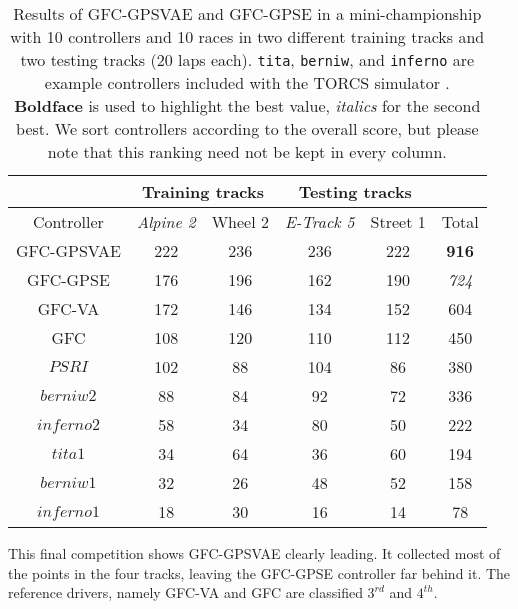 \documentclass[10pt,journal,compsoc]{IEEEtran}
\begin{document}
\begin{table}[ht]
  \centering
  {\scriptsize
    \caption{ Results of {\sf GFC-GPSVAE} and {\sf GFC-GPSE}
      in a mini-championship with 10 controllers
      and 10 races in two different training tracks and two testing tracks (20 laps each). {\tt tita}, {\tt berniw}, and {\tt inferno} are example controllers included with the TORCS
      simulator \cite{torcs4}.  {\bf Boldface} is used to highlight
      the best value, {\em italics} for the second
      best. We sort controllers according to the
        overall score, but please note that this ranking need not be
        kept in every column.}
    {
            \begin{tabular}{|c|c|c|c|c||c|}
	\hline
	& \multicolumn{2}{|c|}{Training tracks} &\multicolumn{2}{|c|}{Testing tracks}& \\
	\hline
	Controller&\textit{Alpine 2} &Wheel 2&\textit{E-Track 5}  &Street 1&Total\\
        \hline
        \hline



{\sf GFC-GPSVAE}	&222&236&236&222&	{\bf 916}\\
{\sf GFC-GPSE}	&176&196&162&190&{\em 724}\\

{\sf GFC-VA} \cite{DBLP:conf/cig/SalemMG19}&172&146&	134&152& 604\\
{\sf GFC}  \cite{salem_cig2018}	&108&	120&110&	112&	450\\
$PSRI$\cite{PerezEvolvingFuzzy09}&102&88 &104&86 &380\\
$berniw2$		&88	&84 &92 &72 &336\\
$inferno2$	&58	&34 &80 &50 &222\\
$tita1$		&34 &64 &36 &60 &194\\
$berniw1$		&32	&26 &48 &52 &158\\
$inferno1$	&18	&30 &16 &14 &78\\
\hline

\end{tabular}
}\label{tab:allsresults}
}
\end{table}




This final competition shows {\sf GFC-GPSVAE} clearly leading. It
collected most of the points in the four tracks, leaving the {\sf
  GFC-GPSE} controller far behind it. The reference drivers, namely
{\sf GFC-VA} and {\sf GFC}  are classified $3^{rd}$ and $4^{th}$.
\end{document}

